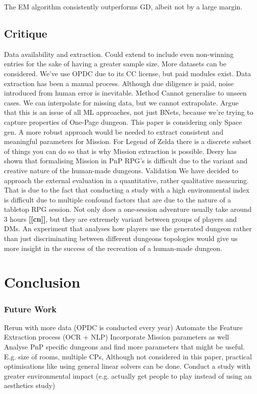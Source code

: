 \documentclass{UoYCSproject}
\begin{document}
The EM algorithm consistently outperforms GD, albeit not by a large margin. 

\section{Critique}
\begin{outline}[enumerate]
  \1 Data
    \2 availability and extraction. 
      \3 Could extend to include even non-winning entries for the sake of having a greater sample size. More datasets can be considered. We've use OPDC due to its CC license, but paid modules exist.
      \3 Data extraction has been a manual process. Although due diligence is paid, noise introduced from human error is inevitable. 
  \1 Method
    \2 Cannot generalise to unseen cases. We can interpolate for missing data, but we cannot extrapolate. Argue that this is an issue of all ML approaches, not just BNets, because we're trying to capture properties of One-Page dungeon.
    \2 This paper is considering only Space gen. A more robust approach would be needed to extract consistent and meaningful parameters for Mission. For Legend of Zelda there is a discrete subset of things you can do so that is why Mission extraction is possible. Deery has shown that formalising Mission in PnP RPG's is difficult due to the variant and creative nature of the human-made dungeons.
  \1 Validation
    \2 We have decided to approach the external evaluation in a quantitative, rather qualitative measuring. That is due to the fact that conducting a study with a high environmental index is difficult due to multiple confound factors that are due to the nature of a tabletop RPG session. Not only does a one-session adventure usually take around 3 hours \textbf{[[cn]]}, but they are extremely variant between groups of players and DMs. An experiment that analyses how players use the generated dungeon rather than just discriminating between different dungeons topologies would give us more insight in the success of the recreation of a human-made dungeon.
  
\end{outline}

\chapter{Conclusion}
\label{cha:conclusion}

\subsection{Future Work}
\begin{outline}[enumerate]
  \1 Rerun with more data (OPDC is conducted every year)
  \1 Automate the Feature Extraction process (OCR + NLP)
  \1 Incorporate Mission parameters as well
  \1 Analyse PnP specific dungeons and find more parameters that might be useful. E.g. size of rooms, multiple CPs, 
  \1 Although not considered in this paper, practical optimisations like using general linear solvers can be done.
  \1 Conduct a study with greater environmental impact (e.g. actually get people to play instead of using an aesthetics study)
\end{outline}
\end{document}
